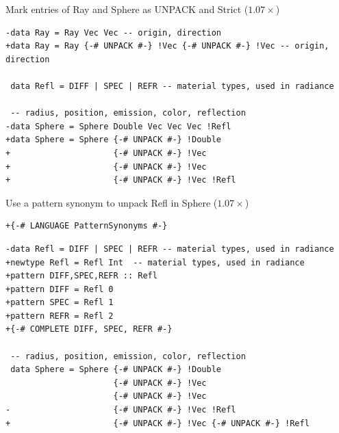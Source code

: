 \documentclass[8pt]{beamer}
\begin{document}
\begin{frame}[fragile]{Mark entries of Ray and Sphere as UNPACK and Strict ($1.07\times$)}

\begin{verbatim}
-data Ray = Ray Vec Vec -- origin, direction
+data Ray = Ray {-# UNPACK #-} !Vec {-# UNPACK #-} !Vec -- origin, direction

 data Refl = DIFF | SPEC | REFR -- material types, used in radiance

 -- radius, position, emission, color, reflection
-data Sphere = Sphere Double Vec Vec Vec !Refl
+data Sphere = Sphere {-# UNPACK #-} !Double 
+                     {-# UNPACK #-} !Vec 
+                     {-# UNPACK #-} !Vec 
+                     {-# UNPACK #-} !Vec !Refl
\end{verbatim}
\end{frame}



\begin{frame}[fragile]{Use a pattern synonym to unpack Refl in Sphere ($1.07\times$)}

\begin{verbatim}
+{-# LANGUAGE PatternSynonyms #-}
\end{verbatim}


\begin{verbatim}
-data Refl = DIFF | SPEC | REFR -- material types, used in radiance
+newtype Refl = Refl Int  -- material types, used in radiance
+pattern DIFF,SPEC,REFR :: Refl
+pattern DIFF = Refl 0
+pattern SPEC = Refl 1
+pattern REFR = Refl 2
+{-# COMPLETE DIFF, SPEC, REFR #-}

 -- radius, position, emission, color, reflection
 data Sphere = Sphere {-# UNPACK #-} !Double 
                      {-# UNPACK #-} !Vec
                      {-# UNPACK #-} !Vec 
-                     {-# UNPACK #-} !Vec !Refl
+                     {-# UNPACK #-} !Vec {-# UNPACK #-} !Refl

 \end{verbatim}
\end{frame}

\end{document}
